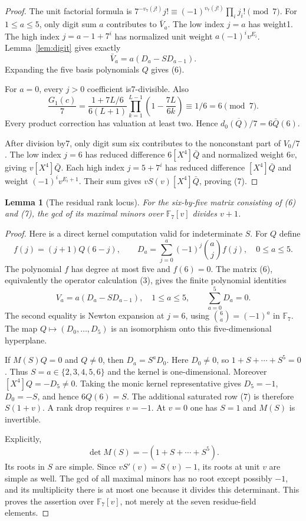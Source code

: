 \documentclass[11pt]{article}
\newtheorem{lemma}{Lemma}
\begin{document}
\begin{proof}
The unit factorial formula is
$7^{-v_7(j!)}j!\equiv(-1)^{v_7(j!)}\prod_i j_i!\pmod7$.
For $1\le a\le5$, only digit sum $a$ contributes to $\bar V_a$.
The low index $j=a$ has weight1. The high index
$j=a-1+7^i$ has normalized unit weight $a(-1)^i v^{E_i}$.
Lemma~\ref{lem:digit} gives exactly
\[
                   \bar V_a=a(D_a-SD_{a-1}).             \tag{5}
\]
Expanding the five basis polynomials $Q$ gives (6).

For $a=0$, every $j>0$ coefficient is7-divisible. Also
\[
 \frac{G_1(c)}7=\frac{1+7L/6}{6(L+1)}
       \prod_{k=1}^{L-1}\left(1-\frac{7L}{6k}\right)
       \equiv1/6=6\pmod7.                               \tag{8}
\]
Every product correction has valuation at least two.
Hence $\overline{d_0(Q)/7}=6\bar Q(6)$.

After division by7, only digit sum six contributes to the
nonconstant part of $V_0/7$.
The low index $j=6$ has reduced difference $6[X^4]\bar Q$
and normalized weight $6v$, giving $v[X^4]\bar Q$.
Each high index $j=5+7^i$ has reduced difference $[X^4]\bar Q$
and weight $(-1)^i v^{E_i+1}$.
Their sum gives $vS(v)[X^4]\bar Q$, proving (7).
\end{proof}


\begin{lemma}[The residual rank locus]\label{lem:rank}
For the six-by-five matrix consisting of (6) and (7), the gcd
of its maximal minors over $\mathbb F_7[v]$ divides $v+1$.
\end{lemma}
\begin{proof}
Here is a direct kernel computation valid for indeterminate $S$.
For $Q$ define
\[
 f(j)=(j+1)Q(6-j),\qquad
 D_a=\sum_{j=0}^a(-1)^j\binom aj f(j),\quad0\le a\le5.
\]
The polynomial $f$ has degree at most five and $f(6)=0$.
The matrix (6), equivalently the operator calculation (3), gives
the finite polynomial identities
\[
 V_a=a(D_a-SD_{a-1}),\quad1\le a\le5,\qquad
                         \sum_{a=0}^5D_a=0.             \tag{9}
\]
The second equality is Newton expansion at $j=6$, using
$\binom6a=(-1)^a$ in $\mathbb F_7$.
The map $Q\mapsto(D_0,\ldots,D_5)$ is an isomorphism onto
this five-dimensional hyperplane.

If $M(S)Q=0$ and $Q\ne0$, then $D_a=S^aD_0$.
Here $D_0\ne0$, so $1+S+\cdots+S^5=0$.
Thus $S=a\in\{2,3,4,5,6\}$ and the kernel is one-dimensional.
Moreover $[X^4]Q=-D_5\ne0$.
Taking the monic kernel representative gives
$D_5=-1$, $D_0=-S$, and hence $6Q(6)=S$.
The additional saturated row (7) is therefore $S(1+v)$.
A rank drop requires $v=-1$.
At $v=0$ one has $S=1$ and $M(S)$ is invertible.

Explicitly,
\[
 \det M(S)=-(1+S+\cdots+S^5).
\]
Its roots in $S$ are simple.
Since $vS'(v)=S(v)-1$, its roots at unit $v$ are simple as well.
The gcd of all maximal minors has no root except possibly $-1$,
and its multiplicity there is at most one because it divides this
determinant. This proves the assertion over $\mathbb F_7[v]$,
not merely at the seven residue-field elements.
\end{proof}
\end{document}
